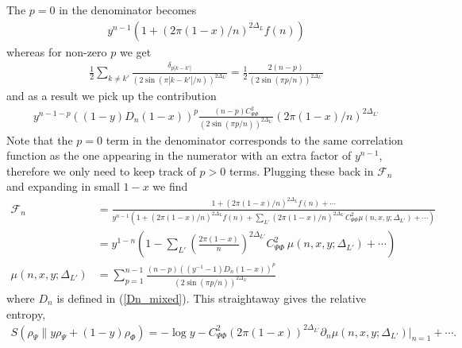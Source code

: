 \documentclass[11pt]{article}
\newcommand{\p}{\partial}
\newcommand{\nn}{\nonumber}
\newcommand{\lb}{\left(}
\newcommand{\rb}{\right)}
\newcommand{\JM}[1]{\textcolor{orange}{#1}}
\begin{document}
The $p=0$ in the denominator becomes
\begin{align}
y^{n-1} (1+(2\pi (1-x)/n)^{2\Delta_L}f(n))
\end{align}
whereas for non-zero $p$ we get
\begin{align}
  \frac{1}{2}\sum_{k\neq k'}\frac{\delta_{p|k-k'|}}{(2\sin(\pi|k-k'|/n))^{2\Delta_{L'}}}=\frac{1}{2}\frac{2(n-p)}{(2\sin(\pi p/n))^{2\Delta_{L'}}}
\end{align}
and as a result we pick up the contribution
\begin{align}
  y^{n-1-p}((1-y) D_n(1-x))^p \frac{(n-p) C_{\Psi\Phi}^2}{(2\sin(\pi p/n))^{2\Delta_{L'}}}(2\pi (1-x)/n)^{2\Delta_{L'}}
\end{align}
Note that the $p=0$ term in the denominator corresponds to the same correlation function as the one appearing in the numerator with an extra factor of $y^{n-1}$, therefore we only need to keep track of $p>0$ terms. Plugging these back in $\mathcal{F}_n$ and expanding in small $1-x$ we find
\begin{align}
\mathcal{F}_n
    &=\frac{\,1+(2\pi (1-x)/n)^{2\Delta_L}f(n)+\cdots\,}{\displaystyle y^{n-1}\lb 1+(2\pi (1-x)/n)^{2\Delta_L} f(n)+\sum_{L'}\lb 2\pi (1-x)/n\rb ^{2\Delta_{L'}} C_{\Psi\Phi}^2\mu(n,x,y;\Delta_{L'})+\cdots\rb}\nn\\
&=y^{1-n}\lb 1-\sum_{L'}\lb\frac{2\pi (1-x)}{n}\rb^{2\Delta_{L'}}  C_{\Psi\Phi}^2 \:\mu(n,x,y;\Delta_{L'})+\cdots \rb\nn\\
\mu(n,x,y;\Delta_{L'})&=\sum_{p=1}^{n-1}\frac{(n-p)((y^{-1}-1)D_n(1-x))^p}{(2\sin(\pi p/n))^{2\Delta_{L'}}} \label{eq: mu (n,x,DeltaL')}
\end{align}
where $D_n$ is defined in (\ref{Dn_mixed}). 
This straightaway gives the relative entropy,
\begin{align}
    S(\rho_\Psi \| y\rho_\Psi + (1-y)\rho_\Phi)=-\log y - C_{\Psi\Phi}^2(2\pi (1-x))^{2\Delta_{L'}}\p_n\mu(n,x,y;\Delta_{L'})|_{n=1}+\cdots.
\end{align}
\end{document}
